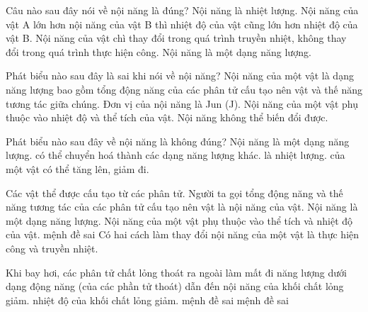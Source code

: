 \begin{ex}
Câu nào sau đây nói về nội năng là đúng?
\choice
{Nội năng là nhiệt lượng.}
{Nội năng của vật A lớn hơn nội năng của vật B thì nhiệt độ của vật cũng lớn hơn nhiệt độ của vật B.}
{Nội năng của vật chì thay đổi trong quá trình truyền nhiệt, không thay đổi trong quá trình thực hiện công.}
{\True Nội năng là một dạng năng lượng.}
\end{ex}

\begin{ex}
Phát biểu nào sau đây là sai khi nói về nội năng?
\choice
{Nội năng của một vật là dạng năng lượng bao gồm tổng động năng của các phân tử cấu tạo nên vật và thế năng tương tác giữa chúng.}
{Đơn vị của nội năng là Jun (J).}
{Nội năng của một vật phụ thuộc vào nhiệt độ và thể tích của vật.}
{\True Nội năng không thể biến đổi được.}
\end{ex}

\begin{ex}
Phát biểu nào sau đây về nội năng là không đúng? Nội năng
\choice
{là một dạng năng lượng.}
{có thể chuyển hoá thành các dạng năng lượng khác.}
{\True là nhiệt lượng.}
{của một vật có thể tăng lên, giảm đi.}
\end{ex}

\begin{ex}
Các vật thể được cấu tạo từ các phân tử. Người ta gọi tổng động năng và thế năng tương tác của các phân tử cấu tạo nên vật là nội năng của vật.
\choiceTF
{\True Nội năng là một dạng năng lượng.}
{\True Nội năng của một vật phụ thuộc vào thể tích và nhiệt độ của vật.}
{mệnh đề sai}
{\True Có hai cách làm thay đổi nội năng của một vật là thực hiện công và truyền nhiệt.}
\end{ex}

\begin{ex}
Khi bay hơi, các phân tử chất lỏng thoát ra ngoài làm mất đi năng lượng dưới dạng động năng (của các phần tử thoát) dẫn đến
\choiceTF
{\True nội năng của khối chất lỏng giảm.}
{\True nhiệt độ của khối chất lỏng giảm.}
{mệnh đề sai}
{mệnh đề sai}
\end{ex}

